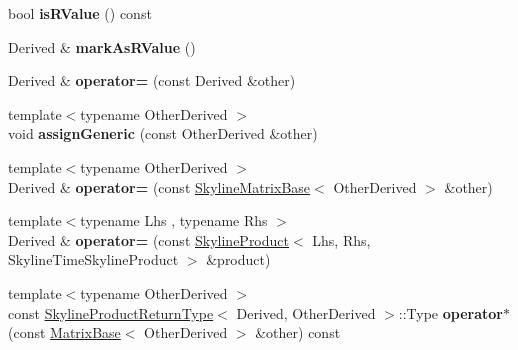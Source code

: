 \begin{DoxyCompactItemize}
bool {\bfseries is\+R\+Value} () const
\item 
\mbox{\label{class_eigen_1_1_skyline_matrix_base_ae0b3e38f3b61c0625446d43fff3f5a2b}} 
Derived \& {\bfseries mark\+As\+R\+Value} ()
\item 
\mbox{\label{class_eigen_1_1_skyline_matrix_base_a37bc55eac2ec8ae4b560247435f30a3c}} 
Derived \& {\bfseries operator=} (const Derived \&other)
\item 
\mbox{\label{class_eigen_1_1_skyline_matrix_base_aa292a7a59be094f9d3184210623ed5ec}} 
{\footnotesize template$<$typename Other\+Derived $>$ }\\void {\bfseries assign\+Generic} (const Other\+Derived \&other)
\item 
\mbox{\label{class_eigen_1_1_skyline_matrix_base_a1714d938a0fa098cb74b627cf84abd08}} 
{\footnotesize template$<$typename Other\+Derived $>$ }\\Derived \& {\bfseries operator=} (const \hyperlink{class_eigen_1_1_skyline_matrix_base}{Skyline\+Matrix\+Base}$<$ Other\+Derived $>$ \&other)
\item 
\mbox{\label{class_eigen_1_1_skyline_matrix_base_a1e10c3dcfbb53b77f471773310e61545}} 
{\footnotesize template$<$typename Lhs , typename Rhs $>$ }\\Derived \& {\bfseries operator=} (const \hyperlink{class_eigen_1_1_skyline_product}{Skyline\+Product}$<$ Lhs, Rhs, Skyline\+Time\+Skyline\+Product $>$ \&product)
\item 
\mbox{\label{class_eigen_1_1_skyline_matrix_base_a6f7465d4e34f77cdcc396acd0b1dbbf5}} 
{\footnotesize template$<$typename Other\+Derived $>$ }\\const \hyperlink{struct_eigen_1_1_skyline_product_return_type}{Skyline\+Product\+Return\+Type}$<$ Derived, Other\+Derived $>$\+::Type {\bfseries operator$\ast$} (const \hyperlink{group___core___module_class_eigen_1_1_matrix_base}{Matrix\+Base}$<$ Other\+Derived $>$ \&other) const
\item 
\mbox{\label{class_eigen_1_1_skyline_matrix_base_a9053e6aa219a3e23d0044de7301a8e8d}} 

\end{DoxyCompactItemize}
